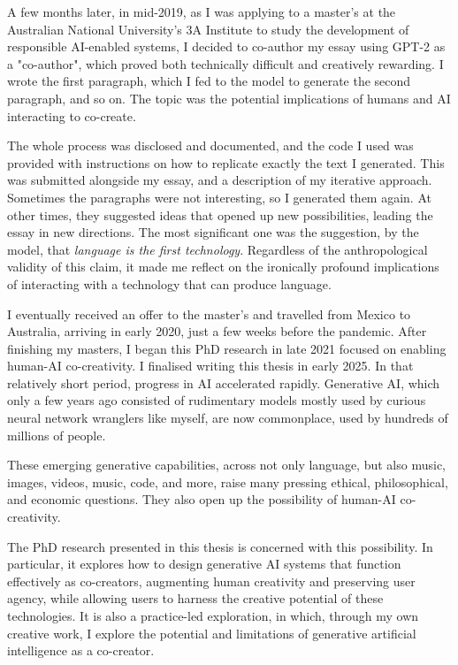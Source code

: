 A few months later, in mid-2019, as I was applying to a master’s at the Australian National University’s 3A Institute to study the development of responsible AI-enabled systems, I decided to co-author my essay using GPT-2 as a "co-author", which proved both technically difficult and creatively rewarding. I wrote the first paragraph, which I fed to the model to generate the second paragraph, and so on. The topic was the potential implications of humans and AI interacting to co-create.

The whole process was disclosed and documented, and the code I used was provided with instructions on how to replicate exactly the text I generated. This was submitted alongside my essay, and a description of my iterative approach. Sometimes the paragraphs were not interesting, so I generated them again. At other times, they suggested ideas that opened up new possibilities, leading the essay in new directions. The most significant one was the suggestion, by the model, that \textit{language is the first technology}. Regardless of the anthropological validity of this claim, it made me reflect on the ironically profound implications of interacting with a technology that can produce language.

I eventually received an offer to the master’s and travelled from Mexico to Australia, arriving in early 2020, just a few weeks before the pandemic. After finishing my masters, I began this PhD research in late 2021 focused on enabling human-AI co-creativity. I finalised writing this thesis in early 2025. In that relatively short period, progress in AI accelerated rapidly. Generative AI, which only a few years ago consisted of rudimentary models mostly used by curious neural network wranglers like myself, are now commonplace, used by hundreds of millions of people.

These emerging generative capabilities, across not only language, but also music, images, videos, music, code, and more, raise many pressing ethical, philosophical, and economic questions. They also open up the possibility of human-AI co-creativity.

The PhD research presented in this thesis is concerned with this possibility. In particular, it explores how to design generative AI systems that function effectively as co-creators, augmenting human creativity and preserving user agency, while allowing users to harness the creative potential of these technologies. It is also a practice-led exploration, in which, through my own creative work, I explore the potential and limitations of generative artificial intelligence as a co-creator. 

